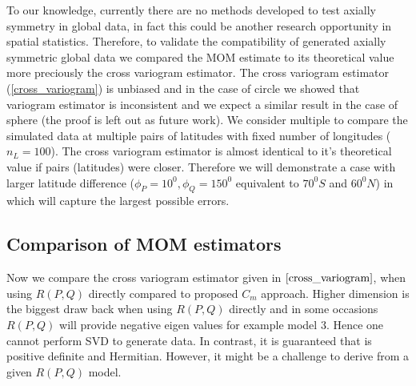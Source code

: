 
%
%

To our knowledge, currently there are no methods developed to test axially symmetry in global data, in fact this could be another research opportunity in spatial statistics. Therefore, to validate the compatibility of generated axially symmetric global data we compared the MOM estimate to its theoretical value more preciously the cross variogram estimator. The cross variogram estimator (\ref{cross_variogram}) is unbiased and in the case of circle we showed that variogram estimator is inconsistent and we expect a similar result in the case of sphere (the proof is left out as future work). We consider multiple to compare the simulated data at multiple pairs of latitudes with fixed number of longitudes ($n_L = 100$). The cross variogram estimator is almost identical to it's theoretical value if pairs (latitudes) were closer. Therefore we will demonstrate a case with larger latitude difference ($\phi_P = 10^0, \phi_Q = 150^0$ equivalent to $70^0S$ and $60^0N$) in which will capture the largest possible errors.


\vskip 24pt

\subsection{\bf Comparison of MOM estimators}

Now we compare the cross variogram estimator given in $\eqref{cross_variogram}$, when using $R(P,Q)$ directly compared to proposed $C_m$ approach. Higher dimension is the biggest draw back when using $R(P,Q)$ directly and in some occasions $R(P,Q)$ will provide negative eigen values for example model 3. Hence one cannot perform SVD to generate data. In contrast, it is guaranteed that \Cm is positive definite and Hermitian. However, it might be a challenge to derive \Cm from a given $R(P,Q)$ model.    

